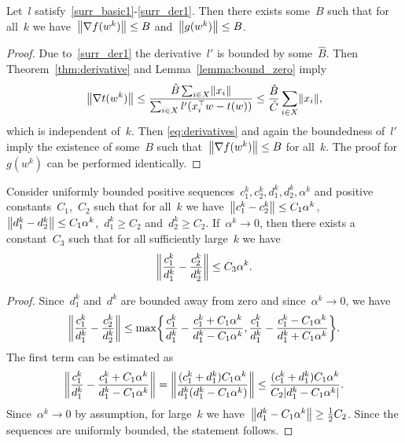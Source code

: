 \begin{lemma}\label{lemma:bound_g}
  Let~$l$ satisfy~\ref{surr_basic1}-\ref{surr_der1}. Then there exists some~$B$ such that for all~$k$ we have~$\norm{\nabla f(w^k)}\le B$ and~$\norm{g(w^k)}\le B$.
\end{lemma}
\begin{proof}
  Due to~\ref{surr_der1} the derivative~$l'$ is bounded by some~$\hat B$. Then Theorem~\ref{thm:derivative} and Lemma~\ref{lemma:bound_zero} imply
  \begin{equation*}
    \norm{\nabla t(w^k)} \le \frac{\hat B\sum_{i\in X}\norm{x_i}
    }{\sum_{i\in X}l'(x_i^\top w-t(w))} \le \frac{\hat B}{\hat C}\sum_{i\in X}\norm{x_i},
  \end{equation*}
  which is independent of~$k$. Then \eqref{eq:derivatives} and again the boundedness of~$l'$ imply the existence of some~$B$ such that~$\norm{\nabla f(w^k)}\le B$ for all~$k$. The proof for~$g(w^k)$ can be performed identically.
\end{proof}

\begin{lemma}\label{lemma:ratio}
  Consider uniformly bounded positive sequences~$c_1^k, c_2^k, d_1^k, d_2^k,\alpha^k$ and positive constants~$C_1$,~$C_2$ such that for all~$k$ we have~$\nrm{c_1^k-c_2^k}\le C_1\alpha^k$,~$\nrm{d_1^k-d_2^k}\le C_1\alpha^k$,~$d_1^k\ge C_2$ and~$d_2^k\ge C_2$. If~$\alpha^k\to 0$, then there exists a constant~$C_3$ such that for all sufficiently large~$k$ we have
  \begin{equation*}
    \norm{\frac{c_1^k}{d_1^k} - \frac{c_2^k}{d_2^k}} \le C_3\alpha^k.
  \end{equation*}
\end{lemma}

\begin{proof}
  Since~$d_1^k$ and~$d^k$ are bounded away from zero and since~$\alpha^k\to 0$, we have
  \begin{equation*}
    \norm{\frac{c_1^k}{d_1^k} - \frac{c_2^k}{d_2^k}} \le \max\Brac[c]{ \frac{c_1^k}{d_1^k} - \frac{c_1^k+C_1\alpha^k}{d_1^k-C_1\alpha^k}, \frac{c_1^k}{d_1^k} - \frac{c_1^k-C_1\alpha^k}{d_1^k+C_1\alpha^k}}.
  \end{equation*}
  The first term can be estimated as
  \begin{equation*}
    \norm{\frac{c_1^k}{d_1^k} - \frac{c_1^k+C_1\alpha^k}{d_1^k-C_1\alpha^k}}
    = \norm{\frac{(c_1^k+d_1^k)C_1\alpha^k}{d_1^k(d_1^k-C_1\alpha^k)}}
    \le \frac{(c_1^k+d_1^k)C_1\alpha^k}{C_2|d_1^k-C_1\alpha^k|}.
  \end{equation*}
  Since~$\alpha^k\to 0$ by assumption, for large~$k$ we have~$\nrm{d_1^k-C_1\alpha^k}\ge \frac{1}{2}C_2$. Since the sequences are uniformly bounded, the statement follows.
\end{proof}
  
